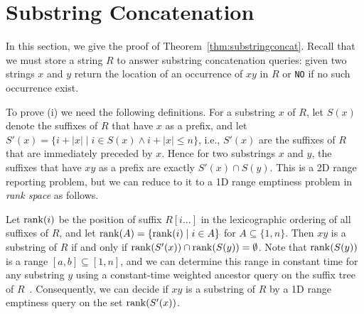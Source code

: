 \section{Substring Concatenation}\label{app:substringconcat}
In this section, we give the proof of Theorem~\ref{thm:substringconcat}. Recall that we must store a string $R$ to answer substring concatenation queries: given two strings $x$ and $y$ return the location of an occurrence of $xy$ in $R$ or \texttt{NO} if no such occurrence exist.



To prove (i) we need the following definitions. For a substring $x$ of $R$, let $S(x)$ denote the suffixes of $R$ that have $x$ as a prefix, and let $S'(x) = \{i+|x| \mid i \in S(x) \wedge i+|x| \leq n\}$, i.e., $S'(x)$ are the suffixes of $R$ that are immediately preceded by $x$. Hence for two substrings $x$ and $y$, the suffixes that have $xy$ as a prefix are exactly $S'(x) \cap S(y)$. This is a 2D range reporting problem, but we can reduce to it to a 1D range emptiness problem in \emph{rank space} as follows.

Let $\mathrm{rank}(i)$ be the position of suffix $R[i...]$ in the lexicographic ordering of all suffixes of $R$, and let $\mathrm{rank}(A) = \{\mathrm{rank}(i) \mid i \in A\}$ for $A \subseteq \{1,n\}$. Then $xy$ is a substring of $R$ if and only if $\mathrm{rank}(S'(x)) \cap \mathrm{rank}(S(y)) = \emptyset$. Note that $\mathrm{rank}(S(y))$ is a range $[a,b] \subseteq [1,n]$, and we can determine this range in constant time for any substring $y$ using a constant-time weighted ancestor query on the suffix tree of $R$~\cite{gawrychowski2014weighted}. Consequently, we can decide if $xy$ is a substring of $R$ by a 1D range emptiness query on the set $\mathrm{rank}(S'(x))$. 

